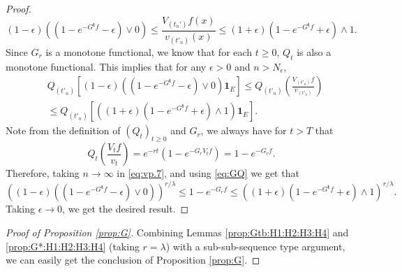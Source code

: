 \documentclass[12pt,a4paper]{amsart}
\numberwithin{equation}{section}
\theoremstyle{plain}
\theoremstyle{definition}
\theoremstyle{remark}
\begin{document}
\begin{proof}
\[
	(1-\epsilon) \left((1 - e^{- G^{\mathbf t}f} - \epsilon)\vee 0\right)
	\leq \frac{V_{(t_n')}f(x)}{v_{(t'_n)}(x)}
	\leq (1+\epsilon) ( 1 - e^{- G^{\mathbf t}f} + \epsilon) \wedge 1.
\]
	Since $G_r$ is a monotone functional, we know that for each $t\geq 0$, $Q_t$ is also a monotone functional.
	This implies that  for any $\epsilon>0$ and $n>N_\epsilon$,
\begin{align} \label{eq:vp.7}
	&Q_{(t'_n)} \left[(1-\epsilon) \left((1 - e^{- G^{\mathbf t}f} - \epsilon)\vee 0\right) \mathbf 1_E \right]
	\leq Q_{(t'_n)}\left( \frac{V_{(t'_n)}f}{v_{(t'_n)}} \right)
	\\&\leq Q_{(t'_n)}\left[ \left((1+\epsilon) ( 1 - e^{- G^{\mathbf t}f} + \epsilon) \wedge 1\right) \mathbf 1_E \right].
\end{align}
	Note from the definition of $(Q_t)_{t\geq 0}$ and $G_r$, we always have for $t>T$ that
\[
	Q_t \left( \frac{V_tf}{v_t}  \right)
	= e^{- r t}( 1 - e^{- G_rV_tf}  )
	= 1- e^{- G_r f}.
\]
	Therefore, taking $n \to \infty$ in \eqref{eq:vp.7}, and using \eqref{eq:GQ}  we get that
\[
	\left((1-\epsilon) \left((1 - e^{- G^{\mathbf t}f} - \epsilon)\vee 0\right) \right)^{r/\lambda}
	\leq 1 - e^{- G_r f}
	 \leq \left((1 + \epsilon) (1 - e^{- G^{\mathbf t} f} + \epsilon)\wedge 1 \right)^{r/\lambda}.
\]
	Taking $\epsilon \to 0$, we get the desired result.
\end{proof}

\begin{proof}[Proof of Proposition \ref{prop:G}]
	Combining  Lemmas \ref{prop:Gtb:H1:H2:H3:H4} and \ref{prop:G*:H1:H2:H3:H4}
	(taking $r=\lambda$)
	with a sub-sub-sequence type argument, we can easily get the conclusion of Proposition \ref{prop:G}.
\end{proof}
\end{document}
